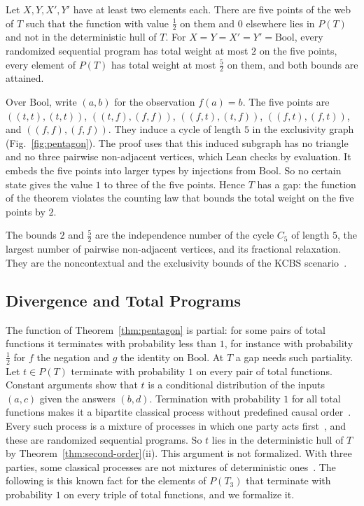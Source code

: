 \begin{theorem}
\label{thm:pentagon}
Let $X, Y, X', Y'$ have at least two elements each. There are five points
of the web of $T$ such that the function with value $\tfrac12$ on them and
$0$ elsewhere lies in $P(T)$ and not in the deterministic hull of $T$. For
$X = Y = X' = Y' = \mathrm{Bool}$, every randomized sequential program has
total weight at most $2$ on the five points, every element of $P(T)$ has
total weight at most $\tfrac52$ on them, and both bounds are attained.
\end{theorem}

\noindent
Over $\mathrm{Bool}$, write $(a, b)$ for the observation $f(a) = b$. The
five points are $((t,t),(t,t))$, $((t,f),(f,f))$, $((f,t),(t,f))$,
$((f,t),(f,t))$, and $((f,f),(f,f))$. They induce a cycle of length $5$ in the exclusivity graph
(Fig.~\ref{fig:pentagon}). The proof uses that this induced subgraph
has no triangle and no three pairwise non-adjacent vertices, which Lean checks by evaluation. It embeds the five points into larger types by
injections from $\mathrm{Bool}$. So no certain state gives the value $1$
to three of the five points. Hence $T$ has a gap: the function of the
theorem violates the counting law that bounds the total weight on the
five points by $2$.

The bounds $2$ and $\tfrac52$ are the independence number of the cycle
$C_5$ of length $5$, the largest number of pairwise non-adjacent vertices,
and its fractional relaxation. They are the noncontextual and the
exclusivity bounds of the KCBS scenario~\cite{cabello2014,klyachko2008}.

\subsection{Divergence and Total Programs}
\label{sec:second-total}

The function of Theorem~\ref{thm:pentagon} is partial: for some pairs of total functions it terminates with probability less
than $1$, for instance with probability $\tfrac12$ for $f$ the negation
and $g$ the identity on $\mathrm{Bool}$. At $T$ a
gap needs such partiality. Let $t \in P(T)$ terminate with probability $1$
on every pair of total functions. Constant arguments show that $t$ is a
conditional distribution of the inputs $(a, c)$ given the answers $(b, d)$. Termination with probability $1$ for all
total functions makes it a bipartite classical process without predefined causal
order~\cite{baumeler-wolf2016}. Every such process is a mixture of
processes in which one party acts first~\cite{baumeler-wolf2016}, and
these are randomized sequential programs. So $t$ lies in the deterministic hull of
$T$ by Theorem~\ref{thm:second-order}(ii). This argument is not
formalized. With three parties, some classical processes are not
mixtures of deterministic ones~\cite{baumeler-wolf2016}. The following
is this known fact for the elements of $P(T_3)$ that terminate with
probability $1$ on every triple of total functions, and we formalize it.

